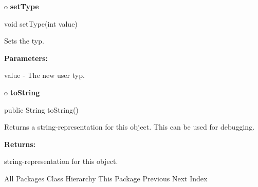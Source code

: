 o {\bf setType} 

\begin{PRE}
 void setType(int value)
\end{PRE}

\begin{description}
\htmlDD Sets the typ. 

\begin{description}
\item {\bf Parameters:}  

value - The new user typ.  
\end{description}

\end{description}

o {\bf toString} 

\begin{PRE}
 public String toString()
\end{PRE}

\begin{description}
\htmlDD Returns a string-representation for this object. This can be used for
debugging. 

\begin{description}
\item {\bf Returns:}  

string-representation for this object.  
\end{description}

\end{description}

\htmlHR

\begin{PRE}
All Packages  Class Hierarchy  This Package  Previous  Next  Index
\end{PRE}


